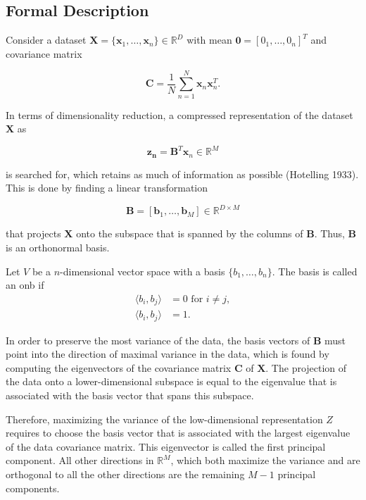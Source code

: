 \documentclass[../../../main.tex]{subfiles}
\begin{document}
\subsection{Formal Description}

Consider a dataset $\bm{X} = \{\bm{x}_1, \dots, \bm{x}_n\} \in \mathbb{R}^D$ with mean $\bm{0} = [0_1, \dots, 0_n]^T$ and covariance matrix

\begin{equation*}
    \bm{C} =\frac{1}{N}\sum_{n=1}^N\bm{x}_n\bm{x}_n^T.
\end{equation*}

In terms of dimensionality reduction, a compressed representation of the dataset $\bm{X}$ as

\begin{equation*}
    \bm{z_n} = \bm{B}^T\bm{x}_n \in \mathbb{R}^M
\end{equation*}

is searched for, which retains as much of information as possible (Hotelling 1933). This is done by finding a linear transformation

\begin{equation*}
    \bm{B}=[\bm{b}_1, \dots, \bm{b}_M] \in \mathbb{R}^{D\times M}
\end{equation*}

that projects $\bm{X}$ onto the subspace that is spanned by the columns of $\bm{B}$. Thus, $\bm{B}$ is an orthonormal basis. 

\begin{definition}\cite[p.65]{dei_2020}
Let $V$ be a $n$-dimensional vector space with a basis $\{ b_1, \dots, b_n \}$. The basis is called an \acrfull{onb} if
\begin{align*}
     \langle b_i, b_j \rangle &= 0 \text{ for } i \neq j, \\
     \langle b_i, b_j \rangle &= 1.
\end{align*}
\end{definition}

In order to preserve the most variance of the data, the basis vectors of $\bm{B}$ must point into the direction of maximal variance in the data, which is found by computing the eigenvectors of the covariance matrix $\bm{C}$ of $\bm{X}$. The projection of the data onto a lower-dimensional subspace is equal to the eigenvalue that is associated with the basis vector that spans this subspace. 

Therefore, maximizing the variance of the low-dimensional representation $Z$ requires to choose the basis vector that is associated with the largest eigenvalue of the data covariance matrix. This eigenvector is called the first principal component. All other directions in $\mathbb{R}^M$, which both maximize the variance and are orthogonal to all the other directions are the remaining $M-1$ principal components.
\end{document}
